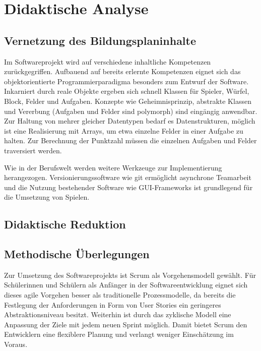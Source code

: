 \documentclass[a4paper,12pt]{article}
\newcommand{\sus}{Schülerinnen und Schüler}
\newcommand{\susn}{\sus n}
\begin{document}
\section{Didaktische Analyse}

\subsection{Vernetzung des Bildungsplaninhalte}

    Im Softwareprojekt wird auf verschiedene inhaltliche Kompetenzen zurückgegriffen.
    Aufbauend auf bereits erlernte Kompetenzen eignet sich das 
    objektorientierte Programmierparadigma besonders zum Entwurf der Software.
    Inkarniert durch reale Objekte ergeben sich schnell Klassen für Spieler, Würfel,
    Block, Felder und Aufgaben.
    Konzepte wie Geheimnisprinzip, abstrakte Klassen und Vererbung (Aufgaben und Felder sind polymorph) 
    sind eingängig anwendbar.
    Zur Haltung von mehrer gleicher Datentypen bedarf es Datenstrukturen,
    möglich ist eine Realisierung mit Arrays, um etwa einzelne Felder in einer Aufgabe zu halten.
    Zur Berechnung der Punktzahl müssen die einzelnen Aufgaben und Felder traversiert werden.

    Wie in der Berufswelt werden weitere Werkzeuge zur Implementierung herangezogen.
    Versionierungssoftware wie git ermöglicht asynchrone Teamarbeit 
    und die Nutzung bestehender Software wie GUI-Frameworks ist grundlegend
    für die Umsetzung von Spielen.

\subsection{Didaktische Reduktion}

\subsection{Methodische Überlegungen}

    Zur Umsetzung des Softwareprojekts ist Scrum als Vorgehensmodell gewählt.
    Für \susn{} als Anfänger in der Softwareentwicklung eignet sich dieses agile Vorgehen besser als 
    traditionelle Prozessmodelle, da bereits die Festlegung der Anforderungen in Form
    von User Stories ein geringeres Abstraktionsniveau besitzt.
    Weiterhin ist durch das zyklische Modell eine Anpassung der Ziele mit jedem neuen Sprint möglich.
    Damit bietet Scrum den Entwicklern eine flexiblere Planung und verlangt weniger Einschätzung im Voraus.
\end{document}
